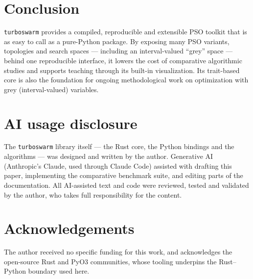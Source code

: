 \documentclass[11pt]{article}
\begin{document}
\section{Conclusion}

\texttt{turboswarm} provides a compiled, reproducible and extensible PSO toolkit
that is as easy to call as a pure-Python package. By exposing many PSO variants,
topologies and search spaces --- including an interval-valued ``grey'' space ---
behind one reproducible interface, it lowers the cost of comparative algorithmic
studies and supports teaching through its built-in visualization. Its
trait-based core is also the foundation for ongoing methodological work on
optimization with grey (interval-valued) variables.

\section*{AI usage disclosure}

The \texttt{turboswarm} library itself --- the Rust core, the Python bindings and
the algorithms --- was designed and written by the author. Generative AI
(Anthropic's Claude, used through Claude Code) assisted with drafting this paper,
implementing the comparative benchmark suite, and editing parts of the
documentation. All AI-assisted text and code were reviewed, tested and validated
by the author, who takes full responsibility for the content.

\section*{Acknowledgements}

The author received no specific funding for this work, and acknowledges the
open-source Rust and PyO3 communities, whose tooling underpins the Rust--Python
boundary used here.



\end{document}
